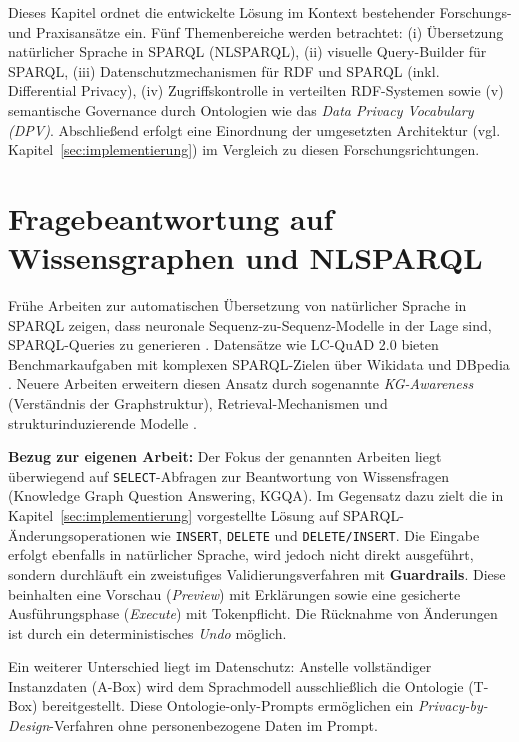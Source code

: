 Dieses Kapitel ordnet die entwickelte Lösung im Kontext bestehender Forschungs- und Praxisansätze ein. Fünf Themenbereiche werden betrachtet: (i) Übersetzung natürlicher Sprache in SPARQL (NL{\textrightarrow}SPARQL), (ii) visuelle Query-Builder für SPARQL, (iii) Datenschutzmechanismen für RDF und SPARQL (inkl. Differential Privacy), (iv) Zugriffskontrolle in verteilten RDF-Systemen sowie (v) semantische Governance durch Ontologien wie das \emph{Data Privacy Vocabulary (DPV)}. Abschließend erfolgt eine Einordnung der umgesetzten Architektur (vgl. Kapitel~\ref{sec:implementierung}) im Vergleich zu diesen Forschungsrichtungen.

\section{Fragebeantwortung auf Wissensgraphen und NL{\textrightarrow}SPARQL}

Frühe Arbeiten zur automatischen Übersetzung von natürlicher Sprache in SPARQL zeigen, dass neuronale Sequenz-zu-Sequenz-Modelle in der Lage sind, SPARQL-Queries zu generieren \cite{yin-nmt-sparql}. Datensätze wie LC-QuAD 2.0 bieten Benchmarkaufgaben mit komplexen SPARQL-Zielen über Wikidata und DBpedia \cite{lcquad2}. Neuere Arbeiten erweitern diesen Ansatz durch sogenannte \emph{KG-Awareness} (Verständnis der Graphstruktur), Retrieval-Mechanismen und strukturinduzierende Modelle \cite{avila-kgqa-llm, pramanik-uniqorn}.

\textbf{Bezug zur eigenen Arbeit:} Der Fokus der genannten Arbeiten liegt überwiegend auf \texttt{SELECT}-Abfragen zur Beantwortung von Wissensfragen (Knowledge Graph Question Answering, KGQA). Im Gegensatz dazu zielt die in Kapitel~\ref{sec:implementierung} vorgestellte Lösung auf SPARQL-Änderungsoperationen wie \texttt{INSERT}, \texttt{DELETE} und \texttt{DELETE/INSERT}. Die Eingabe erfolgt ebenfalls in natürlicher Sprache, wird jedoch nicht direkt ausgeführt, sondern durchläuft ein zweistufiges Validierungsverfahren mit \textbf{Guardrails}. Diese beinhalten eine Vorschau (\textit{Preview}) mit Erklärungen sowie eine gesicherte Ausführungsphase (\textit{Execute}) mit Tokenpflicht. Die Rücknahme von Änderungen ist durch ein deterministisches \textit{Undo} möglich.

Ein weiterer Unterschied liegt im Datenschutz: Anstelle vollständiger Instanzdaten (A-Box) wird dem Sprachmodell ausschließlich die Ontologie (T-Box) bereitgestellt. Diese Ontologie-only-Prompts ermöglichen ein \textit{Privacy-by-Design}-Verfahren ohne personenbezogene Daten im Prompt.


